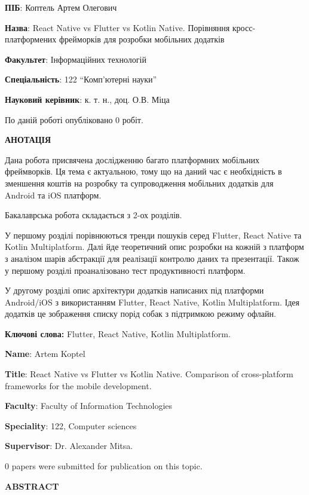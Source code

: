 
\textbf{ПІБ}: Коптель Артем Олегович

\textbf{Назва}: React Native vs Flutter vs Kotlin Native. Порівняння кросс-платформених фрейморків для розробки мобільних додатків

\textbf{Факультет}: Інформаційних технологій

\textbf{Спеціальність}: 122 ``Комп'ютерні науки''

\textbf{Науковий керівник}: к. т. н., доц. О.В. Міца

По даній роботі опубліковано $0$ робіт.

\begin{center}
\textbf{АНОТАЦІЯ}
\end{center}

Дана робота присвячена дослідженню багато платформних мобільних фреймворків.
Ця тема є актуальною, тому що на даний час є необхідність в зменшення коштів на розробку та супроводження
мобільних додатків для Android та iOS платформ.

Бакалаврська робота складається з 2-ох розділів.

У першому розділі порівнюються тренди пошуків серед Flutter, React Native та Kotlin Multiplatform.
Далі йде теоретичний опис розробки на кожній з платформ з аналізом шарів абстракції для реалізації
контролю даних та презентації. Також у першому розділі проаналізовано тест продуктивності платформ.

У другому розділі опис архітектури додатків написаних під платформи Android/iOS з використанням
Flutter, React Native, Kotlin Multiplatform. Ідея додатків це зображення списку порід собак з
підтримкою режиму офлайн.

{\bf Ключові слова:} Flutter, React Native, Kotlin Multiplatform.

\newpage

\textbf{Name}: Artem Koptel

\textbf{Title}: React Native vs Flutter vs Kotlin Native. Comparison of cross-platform frameworks for the mobile development.

\textbf{Faculty}: Faculty of Information Technologies

\textbf{Speciality}: 122, Computer sciences

\textbf{Supervisor}: Dr. Alexander Mitsa. 

$0$ papers were submitted for publication on this topic.

\begin{center}
\textbf{ABSTRACT}
\end{center}

